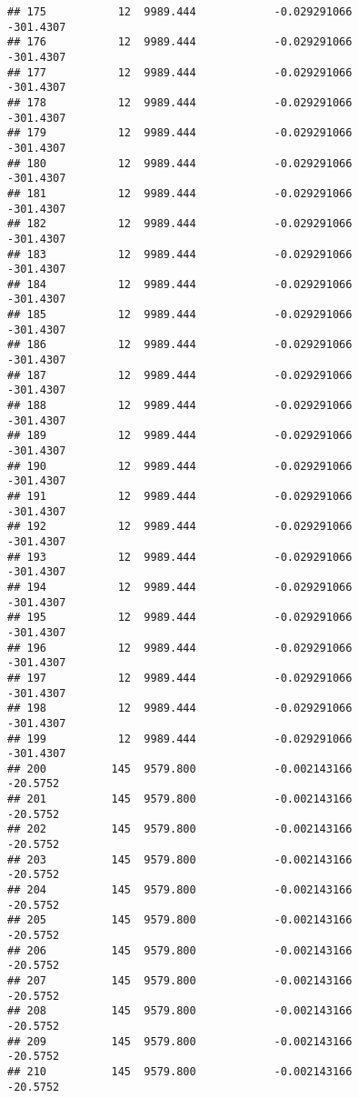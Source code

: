 \documentclass[]{article}
\begin{document}
\begin{verbatim}
## 175           12  9989.444            -0.029291066          -301.4307
## 176           12  9989.444            -0.029291066          -301.4307
## 177           12  9989.444            -0.029291066          -301.4307
## 178           12  9989.444            -0.029291066          -301.4307
## 179           12  9989.444            -0.029291066          -301.4307
## 180           12  9989.444            -0.029291066          -301.4307
## 181           12  9989.444            -0.029291066          -301.4307
## 182           12  9989.444            -0.029291066          -301.4307
## 183           12  9989.444            -0.029291066          -301.4307
## 184           12  9989.444            -0.029291066          -301.4307
## 185           12  9989.444            -0.029291066          -301.4307
## 186           12  9989.444            -0.029291066          -301.4307
## 187           12  9989.444            -0.029291066          -301.4307
## 188           12  9989.444            -0.029291066          -301.4307
## 189           12  9989.444            -0.029291066          -301.4307
## 190           12  9989.444            -0.029291066          -301.4307
## 191           12  9989.444            -0.029291066          -301.4307
## 192           12  9989.444            -0.029291066          -301.4307
## 193           12  9989.444            -0.029291066          -301.4307
## 194           12  9989.444            -0.029291066          -301.4307
## 195           12  9989.444            -0.029291066          -301.4307
## 196           12  9989.444            -0.029291066          -301.4307
## 197           12  9989.444            -0.029291066          -301.4307
## 198           12  9989.444            -0.029291066          -301.4307
## 199           12  9989.444            -0.029291066          -301.4307
## 200          145  9579.800            -0.002143166           -20.5752
## 201          145  9579.800            -0.002143166           -20.5752
## 202          145  9579.800            -0.002143166           -20.5752
## 203          145  9579.800            -0.002143166           -20.5752
## 204          145  9579.800            -0.002143166           -20.5752
## 205          145  9579.800            -0.002143166           -20.5752
## 206          145  9579.800            -0.002143166           -20.5752
## 207          145  9579.800            -0.002143166           -20.5752
## 208          145  9579.800            -0.002143166           -20.5752
## 209          145  9579.800            -0.002143166           -20.5752
## 210          145  9579.800            -0.002143166           -20.5752

\end{verbatim}
\end{document}
